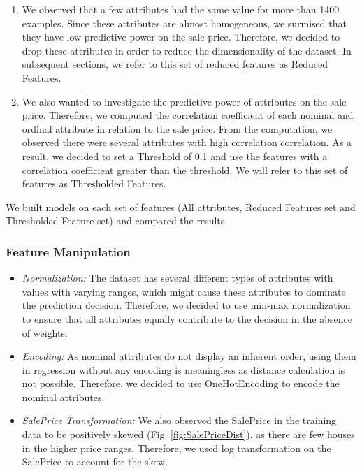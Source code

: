 \documentclass[conference,compsoc]{IEEEtran}
\begin{document}
\begin{enumerate} 
\par 
\item We observed that a few attributes had the same value for more than 1400 examples. Since these attributes are almost homogeneous, we surmised that they have low predictive power on the sale price. Therefore, we decided to drop these attributes in order to reduce the dimensionality of the dataset. In subsequent sections, we refer to this set of reduced features as Reduced Features. 

\par
\item We also wanted to investigate the predictive power of attributes on the sale price. Therefore, we computed the correlation coefficient of each nominal and ordinal attribute in relation to the sale price. From the computation, we observed there were several attributes with high correlation correlation. As a result, we decided to set a Threshold of 0.1 and use the features with a correlation coefficient greater than the threshold. We will refer to this set of features as Thresholded Features.
\end{enumerate}

\par
We built models on each set of features (All attributes, Reduced Features set and Thresholded Feature set) and compared the results.

\subsubsection{Feature Manipulation}
\begin{itemize}  
\par
\item \textit{Normalization: } The dataset has several different types of attributes with values with varying ranges, which might cause these attributes to dominate the prediction decision. Therefore, we decided to use min-max normalization to ensure that all attributes equally contribute to the decision in the absence of weights.
\par
\item \textit{Encoding: } As nominal attributes do not display an inherent order, using them in regression without any encoding is meaningless as distance calculation is not possible. Therefore, we decided to use OneHotEncoding to encode the nominal attributes.  
\par
\item \textit{SalePrice Transformation: } We also observed the SalePrice in the training data to be positively skewed (Fig. \ref{fig:SalePriceDist}), as there are few houses in the higher price ranges. Therefore, we used log transformation on the SalePrice to account for the skew.  
\end{itemize}
\end{document}
